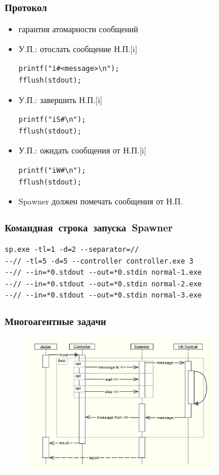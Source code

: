 \documentclass{beamer}
\begin{document}
\begin{frame}[fragile]
  \frametitle{Протокол}
  \begin{itemize}
  \item гарантия атомарности сообщений
  \item {
  У.П.: отослать сообщение Н.П.[i]
\begin{lstlisting}
printf("i#<message>\n");
fflush(stdout);
\end{lstlisting}
}
  \item { У.П.: завершить Н.П.[i]
\begin{lstlisting}
printf("iS#\n");
fflush(stdout);
\end{lstlisting}
}
  \item { У.П.: ожидать сообщения от Н.П.[i]
\begin{lstlisting}
printf("iW#\n");
fflush(stdout);
\end{lstlisting}
}
  \item Spawner должен помечать сообщения от Н.П.
  \end{itemize}
\end{frame}

\begin{frame}[fragile]
  \frametitle{Командная~строка~запуска~Spawner}

\begin{lstlisting}
sp.exe -tl=1 -d=2 --separator=//
--// -tl=5 -d=5 --controller controller.exe 3
--// --in=*0.stdout --out=*0.stdin normal-1.exe
--// --in=*0.stdout --out=*0.stdin normal-2.exe
--// --in=*0.stdout --out=*0.stdin normal-3.exe
\end{lstlisting}
\end{frame}


\begin{frame}
  \frametitle{Многоагентные задачи}
  \begin{figure}[htb]
  \centering
  \includegraphics[height=6cm,keepaspectratio]{./img/ai_contest_problem.png}
  \end{figure}
\end{frame}
\end{document}
